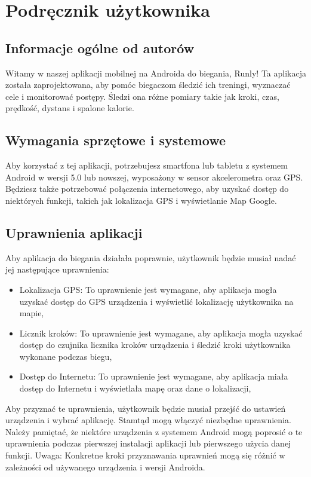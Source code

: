 	\newpage
\section{Podręcznik użytkownika}  %

\subsection{Informacje ogólne od autorów} %

Witamy w naszej aplikacji mobilnej na Androida do biegania, Runly! Ta aplikacja została zaprojektowana, aby pomóc biegaczom śledzić ich treningi, wyznaczać cele i monitorować postępy. Śledzi ona różne pomiary takie jak kroki, czas, prędkość, dystans i spalone kalorie.

\subsection{Wymagania sprzętowe i systemowe} %

Aby korzystać z tej aplikacji, potrzebujesz smartfona lub tabletu z systemem Android w wersji 5.0 lub nowszej, wyposażony w sensor akcelerometra oraz GPS. Będziesz także potrzebować połączenia internetowego, aby uzyskać dostęp do niektórych funkcji, takich jak lokalizacja GPS i wyświetlanie Map Google.

\subsection{Uprawnienia aplikacji}

Aby aplikacja do biegania działała poprawnie, użytkownik będzie musiał nadać jej następujące uprawnienia:

\begin{itemize}
	\item Lokalizacja GPS: To uprawnienie jest wymagane, aby aplikacja mogła uzyskać dostęp do GPS urządzenia i wyświetlić lokalizację użytkownika na mapie,
	\item Licznik kroków: To uprawnienie jest wymagane, aby aplikacja mogła uzyskać dostęp do czujnika licznika kroków urządzenia i śledzić kroki użytkownika wykonane podczas biegu,
	\item Dostęp do Internetu: To uprawnienie jest wymagane, aby aplikacja miała dostęp do Internetu i wyświetlała mapę oraz dane o lokalizacji,
\end{itemize}
Aby przyznać te uprawnienia, użytkownik będzie musiał przejść do ustawień urządzenia i wybrać aplikację. Stamtąd mogą włączyć niezbędne uprawnienia. Należy pamiętać, że niektóre urządzenia z systemem Android mogą poprosić o te uprawnienia podczas pierwszej instalacji aplikacji lub pierwszego użycia danej funkcji. Uwaga: Konkretne kroki przyznawania uprawnień mogą się różnić w zależności od używanego urządzenia i wersji Androida.

